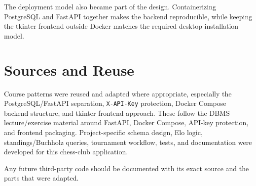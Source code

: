 \documentclass[11pt,a4paper]{article}
\begin{document}
The deployment model also became part of the design. Containerizing PostgreSQL and FastAPI together makes the backend reproducible, while keeping the tkinter frontend outside Docker matches the required desktop installation model.

\section{Sources and Reuse}
Course patterns were reused and adapted where appropriate, especially the PostgreSQL/FastAPI separation, \texttt{X-API-Key} protection, Docker Compose backend structure, and tkinter frontend approach. These follow the DBMS lecture/exercise material around FastAPI, Docker Compose, API-key protection, and frontend packaging. Project-specific schema design, Elo logic, standings/Buchholz queries, tournament workflow, tests, and documentation were developed for this chess-club application.

Any future third-party code should be documented with its exact source and the parts that were adapted.
\end{document}
